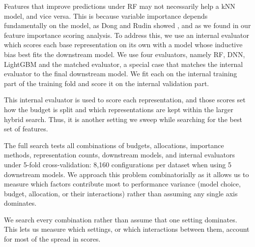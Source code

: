 Features that improve predictions under RF may not necessarily help a kNN model, and vice versa. This is because variable importance depends fundamentally on the model, as Dong and Rudin showed \citep{Dong2020}, and as we found in our feature importance scoring analysis. To address this, we use an internal evaluator which scores each base representation on its own with a model whose inductive bias best fits the downstream model. We use four evaluators, namely RF, DNN, LightGBM and the matched evaluator, a special case that matches the internal evaluator to the final downstream model. We fit each on the internal training part of the training fold and score it on the internal validation part.

This internal evaluator is used to score each representation, and those scores set how the budget is split and which representations are kept within the larger hybrid search. Thus, it is another setting we sweep while searching for the best set of features.

The full search tests all combinations of budgets, allocations, importance methods, representation counts, downstream models, and internal evaluators under 5-fold cross-validation: 8,160 configurations per dataset when using 5 downstream models. We approach this problem combinatorially as it allows us to measure which factors contribute most to performance variance (model choice, budget, allocation, or their interactions) rather than assuming any single axis dominates.

We search every combination rather than assume that one setting dominates. This lets us measure which settings, or which interactions between them, account for most of the spread in scores.

